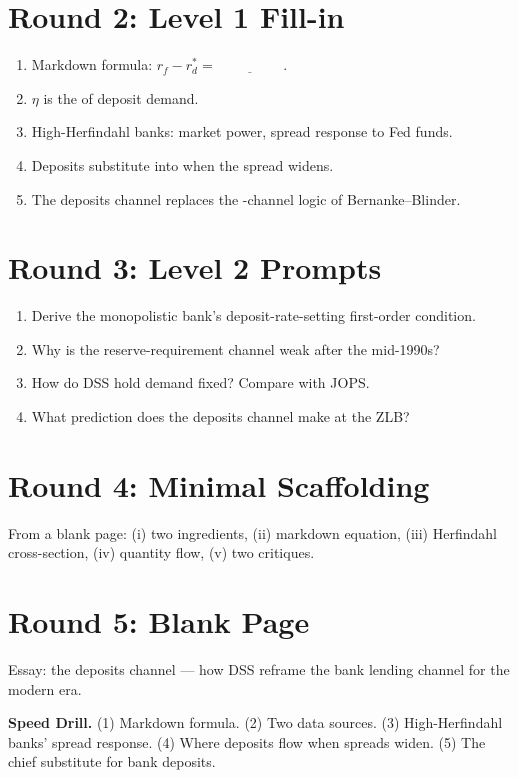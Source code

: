 \documentclass[11pt]{article}
\newcommand{\blank}[1]{\underline{\hspace{#1}}}
\begin{document}
\section*{Round 2: Level 1 Fill-in}
\begin{enumerate}
\item Markdown formula: $r_f-r_d^*=\blank{2cm}$.
\item $\eta$ is the \blank{2cm} of deposit demand.
\item High-Herfindahl banks: \blank{2cm} market power, \blank{2cm} spread response to Fed funds.
\item Deposits substitute into \blank{3cm} when the spread widens.
\item The deposits channel replaces the \blank{2cm}-channel logic of Bernanke--Blinder.
\end{enumerate}

\section*{Round 3: Level 2 Prompts}
\begin{enumerate}
\item Derive the monopolistic bank's deposit-rate-setting first-order condition.
\item Why is the reserve-requirement channel weak after the mid-1990s?
\item How do DSS hold demand fixed? Compare with JOPS.
\item What prediction does the deposits channel make at the ZLB?
\end{enumerate}

\section*{Round 4: Minimal Scaffolding}
From a blank page: (i) two ingredients, (ii) markdown equation, (iii) Herfindahl cross-section, (iv) quantity flow, (v) two critiques.

\section*{Round 5: Blank Page}
Essay: the deposits channel --- how DSS reframe the bank lending channel for the modern era.

\vspace{6pt}
\begin{drillbox}
\textbf{Speed Drill.} (1) Markdown formula. (2) Two data sources. (3) High-Herfindahl banks' spread response. (4) Where deposits flow when spreads widen. (5) The chief substitute for bank deposits.
\end{drillbox}
\end{document}
